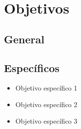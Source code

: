 \chapter{Objetivos}
\label{Objetivos}

\section{General}
\section{Específicos}
\begin{itemize}
    \item Objetivo específico 1
    \item Objetivo específico 2
    \item Objetivo específico 3
\end{itemize}